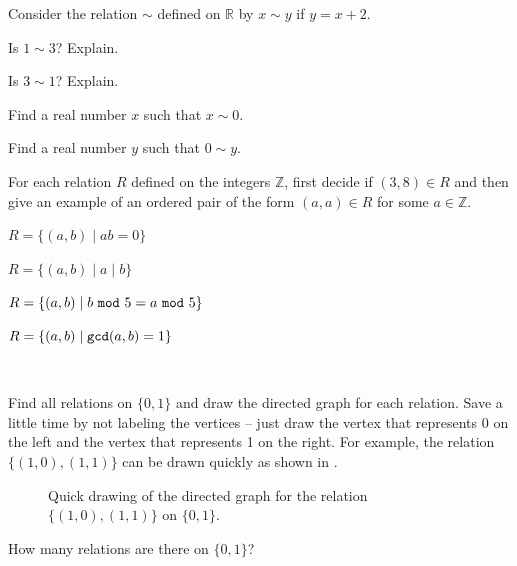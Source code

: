 \begin{exer} [\exerP] %
\label{exer_linear_relation_reals} 
    Consider the relation $\sim$ defined on $\mathbb{R}$ by $x \sim y$ if $y = x+2$.
        \begin{exerpart}
            \item Is $1 \sim 3$? Explain.
            \item Is $3 \sim 1$? Explain.
            \item Find a real number $x$ such that $x \sim 0$.
            \item Find a real number $y$ such that $0 \sim y$.
        \end{exerpart}
\end{exer}

\begin{exer} [\exerP] %
\label{exer_relations_integerfs} 
    For each relation $R$ defined on the integers $\mathbb{Z}$, first decide if $(3,8) \in R$ and then give an example of an ordered pair of the form $(a,a) \in R$ for some $a \in \mathbb{Z}$.
        \begin{exerpart}
            \item $R= \{(a,b) \mid ab =0 \}$
            \item $R=\{(a,b) \mid a \mid b \}$            
            \item $R=\{(a,b) \mid b ~\texttt{mod}~ 5 = a ~\texttt{mod}~ 5 \}$ 
            \item $R=\{(a,b) \mid \texttt{gcd}(a,b)=1 \}$ 
        \end{exerpart}
\end{exer} 

\begin{exer} [\exerU] %
\label{exer_all_relations_01} 
~
    \begin{exerpart}
        \item Find all relations on $\{0,1\}$ and draw the directed graph for each relation. Save a little time by not labeling the vertices -- just draw the vertex that represents 0 on the left and the vertex that represents 1 on the right. For example, the relation $\{(1,0),(1,1)\}$ can be drawn quickly as shown in .
            \begin{figure}[hbtp]
                \centering
                
                \caption{Quick drawing of the directed graph for the relation $\{(1,0),(1,1)\}$ on $\{0,1\}$.}
                \label{fig_reln_01_quick}
            \end{figure}
        \item How many relations are there on $\{0,1\}$?
    \end{exerpart}
\end{exer}

